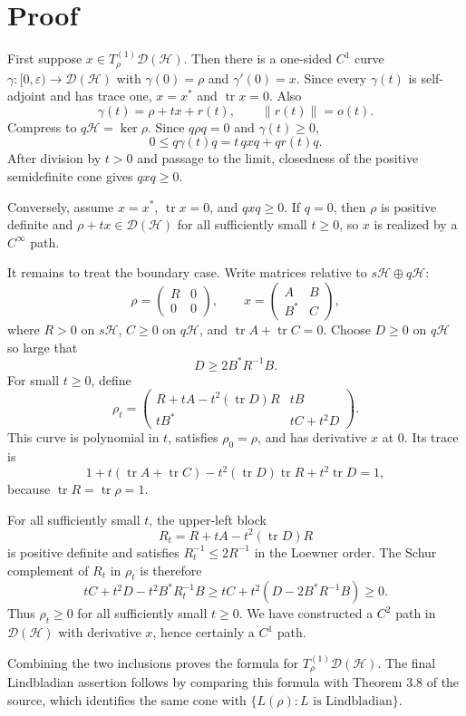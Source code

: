 \documentclass[11pt]{article}
\newcommand{\D}{\mathcal D}
\newcommand{\Hh}{\mathcal H}
\newcommand{\tr}{\operatorname{tr}}
\begin{document}
\section*{Proof}

First suppose $x\in T^{(1)}_\rho \D(\Hh)$.  Then there is a one-sided
$C^1$ curve $\gamma:[0,\varepsilon)\to \D(\Hh)$ with $\gamma(0)=\rho$ and
$\gamma'(0)=x$.  Since every $\gamma(t)$ is self-adjoint and has trace one,
$x=x^*$ and $\tr x=0$.  Also
\[
  \gamma(t)=\rho+t x+r(t),\qquad \|r(t)\|=o(t).
\]
Compress to $q\Hh=\ker\rho$.  Since $q\rho q=0$ and $\gamma(t)\ge 0$,
\[
  0\le q\gamma(t)q=t\,qxq+q r(t)q .
\]
After division by $t>0$ and passage to the limit, closedness of the positive
semidefinite cone gives $qxq\ge 0$.

Conversely, assume $x=x^*$, $\tr x=0$, and $qxq\ge 0$.  If $q=0$, then $\rho$
is positive definite and $\rho+t x\in\D(\Hh)$ for all sufficiently small
$t\ge 0$, so $x$ is realized by a $C^\infty$ path.

It remains to treat the boundary case.  Write matrices relative to
$s\Hh\oplus q\Hh$:
\[
  \rho=
  \begin{pmatrix} R&0\\0&0\end{pmatrix},
  \qquad
  x=
  \begin{pmatrix} A&B\\B^*&C\end{pmatrix},
\]
where $R>0$ on $s\Hh$, $C\ge 0$ on $q\Hh$, and
$\tr A+\tr C=0$.  Choose $D\ge 0$ on $q\Hh$ so large that
\[
  D\ge 2B^*R^{-1}B .
\]
For small $t\ge 0$, define
\[
  \rho_t=
  \begin{pmatrix}
  R+tA-t^2(\tr D)R & tB\\
  tB^* & tC+t^2D
  \end{pmatrix}.
\]
This curve is polynomial in $t$, satisfies $\rho_0=\rho$, and has derivative
$x$ at $0$.  Its trace is
\[
  1+t(\tr A+\tr C)-t^2(\tr D)\tr R+t^2\tr D=1,
\]
because $\tr R=\tr\rho=1$.

For all sufficiently small $t$, the upper-left block
\[
R_t=R+tA-t^2(\tr D)R
\]
is positive definite and satisfies $R_t^{-1}\le 2R^{-1}$ in the Loewner order.
The Schur complement of $R_t$ in $\rho_t$ is therefore
\[
  tC+t^2D-t^2B^*R_t^{-1}B
  \ge
  tC+t^2(D-2B^*R^{-1}B)
  \ge 0.
\]
Thus $\rho_t\ge 0$ for all sufficiently small $t\ge 0$.  We have constructed a
$C^2$ path in $\D(\Hh)$ with derivative $x$, hence certainly a $C^1$ path.

Combining the two inclusions proves the formula for $T^{(1)}_\rho\D(\Hh)$.
The final Lindbladian assertion follows by comparing this formula with
Theorem 3.8 of the source, which identifies the same cone with
$\{L(\rho):L\text{ is Lindbladian}\}$.
\end{document}

